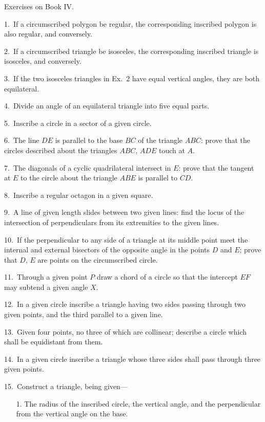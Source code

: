 \documentclass[oneside]{book}
\newcommand\exhead[1]{
\Needspace*{5\baselineskip}\begin{center}
\textsf{#1}
\end{center}
}
\begin{document}
\exhead{Exercises on Book IV\@.}

\begin{footnotesize}
1.~If a circumscribed polygon be regular, the corresponding
inscribed polygon is also regular, and conversely.

2.~If a circumscribed triangle be isosceles, the corresponding
inscribed triangle is isosceles, and conversely.

3.~If the two isosceles triangles in Ex.~2 have equal vertical
angles, they are both equilateral.

4.~Divide an angle of an equilateral triangle into five equal
parts.

5.~Inscribe a circle in a sector of a given circle.

6.~The line $DE$ is parallel to the base $BC$ of the triangle $ABC$:
prove that the circles described about the triangles $ABC$, $ADE$
touch at $A$.

7.~The diagonals of a cyclic quadrilateral intersect in $E$: prove
that the tangent at $E$ to the circle about the triangle $ABE$ is
parallel to $CD$.

8.~Inscribe a regular octagon in a given square.

9.~A line of given length slides between two given lines: find
the locus of the intersection of perpendiculars from its extremities
to the given lines.

10.~If the perpendicular to any side of a triangle at its middle
point meet the internal and external bisectors of the opposite
angle in the points $D$ and $E$; prove that $D$, $E$ are points on the
circumscribed circle.

11.~Through a given point $P$ draw a chord of a circle so that
the intercept $EF$ may subtend a given angle $X$.

12.~In a given circle inscribe a triangle having two sides passing
through two given points, and the third parallel to a given
line.

13.~Given four points, no three of which are collinear; describe
a circle which shall be equidistant from them.

14.~In a given circle inscribe a triangle whose three sides shall
pass through three given points.

15.~Construct a triangle, being given---
\begin{changemargin}{0.3in}{0in}
\begin{enumerate}
\item[1.] The radius of the inscribed circle, the vertical angle,
and the perpendicular from the vertical angle on the
base.


\end{enumerate}
\end{changemargin}
\end{footnotesize}
\end{document}
